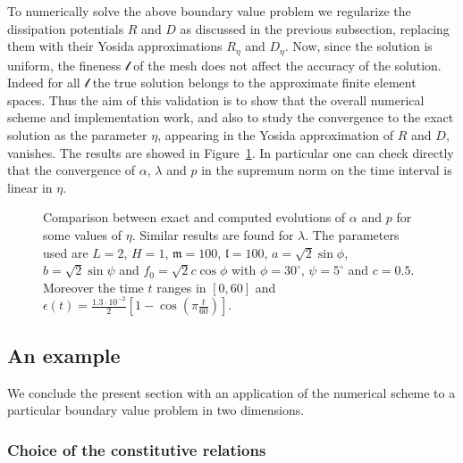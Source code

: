 \documentclass[a4paper,10pt,oneside]{amsbook}
\numberwithin{section}{chapter}
\numberwithin{equation}{chapter}
\theoremstyle{definition}
\begin{document}
To numerically solve the above boundary value problem we regularize the dissipation potentials  $R$ and $D$ as discussed in the previous subsection, replacing them with their Yosida approximations $R_\eta$ and $D_\eta$. Now, since the solution is uniform, the fineness $\mathscr{l}$ of the mesh does not affect the accuracy of the solution. Indeed for all $\mathscr{l}$ the true solution belongs to the approximate finite element spaces. Thus the aim of this validation is to show that the overall numerical scheme and implementation work, and also to study the convergence to the exact solution as the parameter $\eta$, appearing in the Yosida approximation of $R$ and $D$, vanishes. The results are showed in Figure~\ref{fig:eta-to-zero}. In particular one can check directly that the convergence of $\alpha$, $\lambda$ and $p$ in the supremum norm on the time interval is linear in $\eta$.
\begin{figure}[htp]
\centering

\;

\caption{Comparison between exact and computed evolutions of $\alpha$ and $p$ for some values of $\eta$. Similar results are found for $\lambda$. The parameters used are $L=2$, $H=1$, $\mathfrak{m}=100$, $\mathfrak{l}=100$, $a=\sqrt{2}\sin\phi$, $b=\sqrt{2}\sin\psi$ and $f_0=\sqrt{2}c\cos\phi$ with $\phi=30^\circ$, $\psi=5^\circ$ and $c=0.5$. Moreover the time $t$ ranges in $[0,60]$ and $\epsilon(t)=\frac{1.3\cdot 10^{-2}}{2}\left[1-\cos\left(\pi\frac{t}{60}\right)\right]$.}
\label{fig:eta-to-zero}
\end{figure}

\subsection{An example}
\label{subsec:numerical-example}

We conclude the present section with an application of the numerical scheme to a particular boundary value problem in two dimensions.

\subsubsection*{Choice of the constitutive relations}
\end{document}
